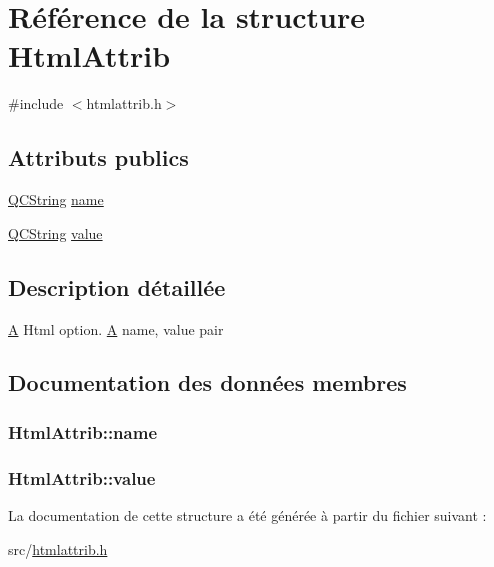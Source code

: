 \hypertarget{struct_html_attrib}{}\section{Référence de la structure Html\+Attrib}
\label{struct_html_attrib}


{\ttfamily \#include $<$htmlattrib.\+h$>$}

\subsection*{Attributs publics}
\begin{DoxyCompactItemize}
\item 
\hyperlink{class_q_c_string}{Q\+C\+String} \hyperlink{struct_html_attrib_a89bb7f09a717b34af2fc9b5466adad63}{name}
\item 
\hyperlink{class_q_c_string}{Q\+C\+String} \hyperlink{struct_html_attrib_a81dc2fb244be20f88455fe84b4f91995}{value}
\end{DoxyCompactItemize}


\subsection{Description détaillée}
\hyperlink{class_a}{A} Html option. \hyperlink{class_a}{A} name, value pair 

\subsection{Documentation des données membres}
\hypertarget{struct_html_attrib_a89bb7f09a717b34af2fc9b5466adad63}{}
\subsubsection[{name}]{ Html\+Attrib\+::name}\label{struct_html_attrib_a89bb7f09a717b34af2fc9b5466adad63}
\hypertarget{struct_html_attrib_a81dc2fb244be20f88455fe84b4f91995}{}
\subsubsection[{value}]{ Html\+Attrib\+::value}\label{struct_html_attrib_a81dc2fb244be20f88455fe84b4f91995}


La documentation de cette structure a été générée à partir du fichier suivant \+:\begin{DoxyCompactItemize}
\item 
src/\hyperlink{htmlattrib_8h}{htmlattrib.\+h}\end{DoxyCompactItemize}
